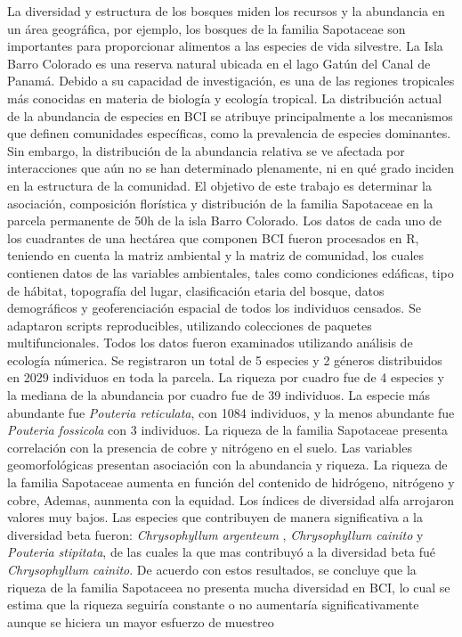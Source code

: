 \documentclass[11pt,]{article}
\renewenvironment{abstract}
 {{%
    \setlength{\leftmargin}{0mm}
    \setlength{\rightmargin}{\leftmargin}%
  }%
  \relax}
 {\endlist}
\begin{document}
\begin{abstract}

    \hbox{\vrule height .2pt width 39.14pc}

    \vskip 8.5pt %

\noindent La diversidad y estructura de los bosques miden los recursos y la
abundancia en un área geográfica, por ejemplo, los bosques de la familia
Sapotaceae son importantes para proporcionar alimentos a las especies de
vida silvestre. La Isla Barro Colorado es una reserva natural ubicada en
el lago Gatún del Canal de Panamá. Debido a su capacidad de
investigación, es una de las regiones tropicales más conocidas en
materia de biología y ecología tropical. La distribución actual de la
abundancia de especies en BCI se atribuye principalmente a los
mecanismos que definen comunidades específicas, como la prevalencia de
especies dominantes. Sin embargo, la distribución de la abundancia
relativa se ve afectada por interacciones que aún no se han determinado
plenamente, ni en qué grado inciden en la estructura de la comunidad. El
objetivo de este trabajo es determinar la asociación, composición
florística y distribución de la familia Sapotaceae en la parcela
permanente de 50h de la isla Barro Colorado. Los datos de cada uno de
los cuadrantes de una hectárea que componen BCI fueron procesados en R,
teniendo en cuenta la matriz ambiental y la matriz de comunidad, los
cuales contienen datos de las variables ambientales, tales como
condiciones edáficas, tipo de hábitat, topografía del lugar,
clasificación etaria del bosque, datos demográficos y geoferenciación
espacial de todos los individuos censados. Se adaptaron scripts
reproducibles, utilizando colecciones de paquetes multifuncionales.
Todos los datos fueron examinados utilizando análisis de ecología
númerica. Se registraron un total de 5 especies y 2 géneros distribuidos
en 2029 individuos en toda la parcela. La riqueza por cuadro fue de 4
especies y la mediana de la abundancia por cuadro fue de 39 individuos.
La especie más abundante fue \emph{Pouteria reticulata}, con 1084
individuos, y la menos abundante fue \emph{Pouteria fossicola} con 3
individuos. La riqueza de la familia Sapotaceae presenta correlación con
la presencia de cobre y nitrógeno en el suelo. Las variables
geomorfológicas presentan asociación con la abundancia y riqueza. La
riqueza de la familia Sapotaceae aumenta en función del contenido de
hidrógeno, nitrógeno y cobre, Ademas, aunmenta con la equidad. Los
índices de diversidad alfa arrojaron valores muy bajos. Las especies que
contribuyen de manera significativa a la diversidad beta fueron:
\emph{Chrysophyllum argenteum} , \emph{Chrysophyllum cainito} y
\emph{Pouteria stipitata}, de las cuales la que mas contribuyó a la
diversidad beta fué \emph{Chrysophyllum cainito}. De acuerdo con estos
resultados, se concluye que la riqueza de la familia Sapotaceea no
presenta mucha diversidad en BCI, lo cual se estima que la riqueza
seguiría constante o no aumentaría significativamente aunque se hiciera
un mayor esfuerzo de muestreo



\end{abstract}
\end{document}
